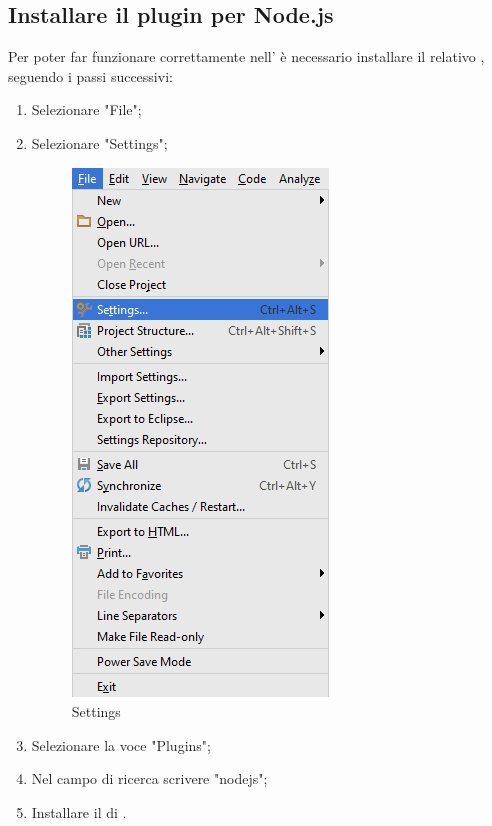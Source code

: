 \documentclass[12pt,a4paper]{article}
\begin{document}
	\subsection{Installare il plugin per Node.js}
	Per poter far funzionare correttamente  nell' è necessario installare il relativo , seguendo i passi successivi:
	\begin{enumerate}
		\item Selezionare "File";
		\item Selezionare "Settings";

		\begin{center}
			\begin{figure}[H]
				\centering \includegraphics[max width=\myheight]{../img/manualeSviluppatore/settings.png}
				\caption{Settings}
			\end{figure}
		\end{center}

		\item Selezionare la voce "Plugins";
		\item Nel campo di ricerca scrivere "nodejs";
		\item Installare il  di .
	\end{enumerate}
\end{document}
